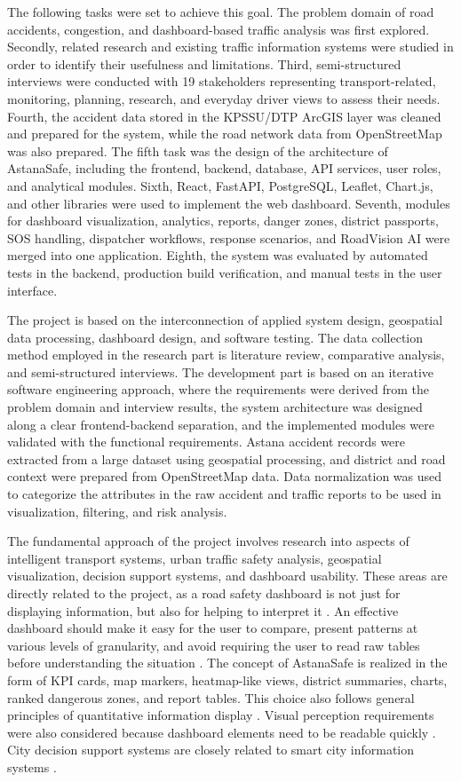 ﻿\documentclass[12pt,a4paper]{report}
\begin{document}
The following tasks were set to achieve this goal. The problem domain of road accidents, congestion, and dashboard-based traffic analysis was first explored. Secondly, related research and existing traffic information systems were studied in order to identify their usefulness and limitations. Third, semi-structured interviews were conducted with 19 stakeholders representing transport-related, monitoring, planning, research, and everyday driver views to assess their needs. Fourth, the accident data stored in the KPSSU/DTP ArcGIS layer was cleaned and prepared for the system, while the road network data from OpenStreetMap was also prepared. The fifth task was the design of the architecture of AstanaSafe, including the frontend, backend, database, API services, user roles, and analytical modules. Sixth, React, FastAPI, PostgreSQL, Leaflet, Chart.js, and other libraries were used to implement the web dashboard. Seventh, modules for dashboard visualization, analytics, reports, danger zones, district passports, SOS handling, dispatcher workflows, response scenarios, and RoadVision AI were merged into one application. Eighth, the system was evaluated by automated tests in the backend, production build verification, and manual tests in the user interface.

The project is based on the interconnection of applied system design, geospatial data processing, dashboard design, and software testing. The data collection method employed in the research part is literature review, comparative analysis, and semi-structured interviews. The development part is based on an iterative software engineering approach, where the requirements were derived from the problem domain and interview results, the system architecture was designed along a clear frontend-backend separation, and the implemented modules were validated with the functional requirements. Astana accident records were extracted from a large dataset using geospatial processing, and district and road context were prepared from OpenStreetMap data. Data normalization was used to categorize the attributes in the raw accident and traffic reports to be used in visualization, filtering, and risk analysis.

The fundamental approach of the project involves research into aspects of intelligent transport systems, urban traffic safety analysis, geospatial visualization, decision support systems, and dashboard usability. These areas are directly related to the project, as a road safety dashboard is not just for displaying information, but also for helping to interpret it \cite{few2006}. An effective dashboard should make it easy for the user to compare, present patterns at various levels of granularity, and avoid requiring the user to read raw tables before understanding the situation \cite{shneiderman1996}. The concept of AstanaSafe is realized in the form of KPI cards, map markers, heatmap-like views, district summaries, charts, ranked dangerous zones, and report tables. This choice also follows general principles of quantitative information display \cite{tufte2001}. Visual perception requirements were also considered because dashboard elements need to be readable quickly \cite{ware2012}. City decision support systems are closely related to smart city information systems \cite{chourabi2012}.
\end{document}
